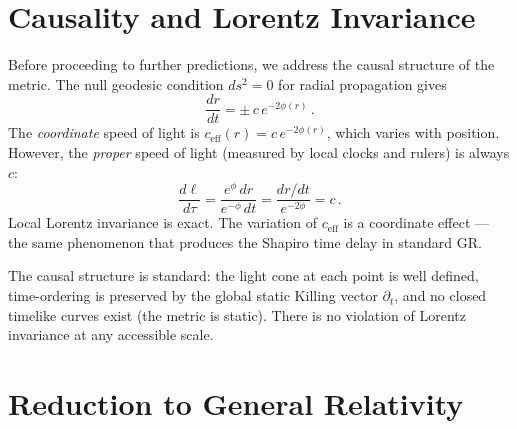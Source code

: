 \documentclass[aps,prd,twocolumn,superscriptaddress,nofootinbib,longbibliography]{revtex4-2}
\begin{document}
\section{Causality and Lorentz Invariance}\label{sec:causality}

Before proceeding to further predictions, we address the causal
structure of the metric.  The null geodesic condition $ds^2 = 0$ for
radial propagation gives
\begin{equation}\label{eq:ceff}
  \frac{dr}{dt} = \pm\,c\,e^{-2\phi(r)}\,.
\end{equation}
The \emph{coordinate} speed of light is
$c_{\mathrm{eff}}(r) = c\,e^{-2\phi(r)}$, which varies with position.
However, the \emph{proper} speed of light (measured by local clocks and
rulers) is always $c$:
\begin{equation}
  \frac{d\ell}{d\tau} = \frac{e^{\phi}\,dr}{e^{-\phi}\,dt}
    = \frac{dr/dt}{e^{-2\phi}} = c\,.
\end{equation}
Local Lorentz invariance is exact.  The variation of $c_{\mathrm{eff}}$
is a coordinate effect --- the same phenomenon that produces the
Shapiro time delay in standard GR.

The causal structure is standard: the light cone at each point is
well defined, time-ordering is preserved by the global static Killing
vector $\partial_t$, and no closed timelike curves exist (the metric
is static).  There is no violation of Lorentz invariance at any
accessible scale.

\section{Reduction to General Relativity}\label{sec:gr-reduction}
\end{document}
